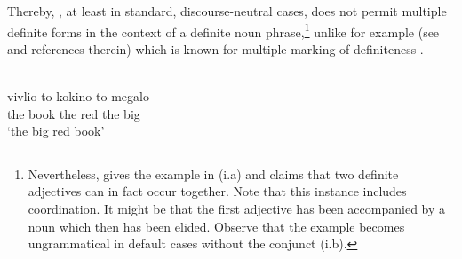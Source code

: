 \documentclass[output=paper,
modfonts
]{langscibook}
\begin{document}
Thereby, , at least in standard, discourse-neutral cases, does not permit multiple definite forms in the context of a definite noun phrase,\footnote{Nevertheless, \citet{Stolz2008} gives the example in (i.a) and claims that two definite adjectives can in fact occur together. Note that this instance includes coordination. It might be that the first adjective has been accompanied by a noun which then has been elided. Observe that the example becomes ungrammatical in default cases without the conjunct (i.b).
	
\ea   {}

\z 
\z} unlike for example  (see \citet{Alexiadou2014} and references therein) which is known for multiple marking of definiteness .

\begin{exe}
\ex \label{ex:sereikaite:10}
 \citep[19]{Alexiadou2014} \\
 {vivlio} {to} {kokino} {to} {megalo}\\
the book the red the big\\
\trans `the big red book' 
\end{exe}
\end{document}
